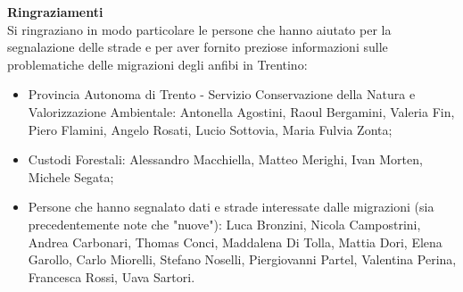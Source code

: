 \documentclass[11pt,a4paper,twoside]{memoir}
\begin{document}
\newpage
\thispagestyle{empty}
\vspace*{\fill}

\textbf{Ringraziamenti} \\

Si ringraziano in modo particolare le persone che hanno aiutato per la segnalazione delle strade e per aver fornito preziose informazioni sulle problematiche delle migrazioni degli anfibi in Trentino: 

\begin{itemize}\itemsep0pt
  \item Provincia Autonoma di Trento - Servizio Conservazione della Natura e Valorizzazione Ambientale: Antonella Agostini, Raoul Bergamini, Valeria Fin, Piero Flamini, Angelo Rosati, Lucio Sottovia, Maria Fulvia Zonta;
  \item Custodi Forestali: Alessandro Macchiella, Matteo Merighi, Ivan Morten, Michele Segata;
  \item Persone che hanno segnalato dati e strade interessate dalle migrazioni (sia precedentemente note che "nuove"): Luca Bronzini, Nicola Campostrini, Andrea Carbonari, Thomas Conci, Maddalena Di Tolla, Mattia Dori, Elena Garollo, Carlo Miorelli, Stefano Noselli, Piergiovanni Partel, Valentina Perina, Francesca Rossi, Uava Sartori.
\end{itemize}
\end{document}
